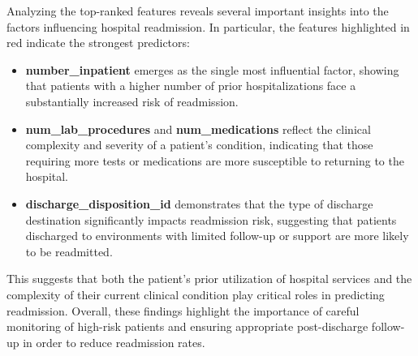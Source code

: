 \noindent
Analyzing the top-ranked features reveals several important insights into the factors influencing hospital readmission. In particular, the features highlighted in red indicate the strongest predictors:

\begin{itemize}
    \item \textbf{number\_inpatient} emerges as the single most influential factor, showing that patients with a higher number of prior hospitalizations face a substantially increased risk of readmission.
    \item \textbf{num\_lab\_procedures} and \textbf{num\_medications} reflect the clinical complexity and severity of a patient's condition, indicating that those requiring more tests or medications are more susceptible to returning to the hospital.
    \item \textbf{discharge\_disposition\_id} demonstrates that the type of discharge destination significantly impacts readmission risk, suggesting that patients discharged to environments with limited follow-up or support are more likely to be readmitted.
\end{itemize}
\noindent
\noindent
This suggests that both the patient's prior utilization of hospital services and the complexity of their current clinical condition play critical roles in predicting readmission. Overall, these findings highlight the importance of careful monitoring of high-risk patients and ensuring appropriate post-discharge follow-up in order to reduce readmission rates.

